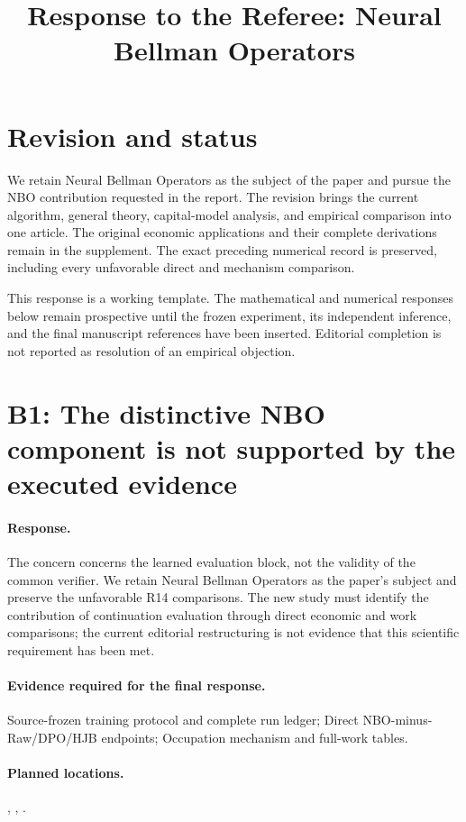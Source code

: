 \begin{frontmatter}
\title{Response to the Referee: Neural Bellman Operators}
\end{frontmatter}
\section*{Revision and status}
We retain Neural Bellman Operators as the subject of the paper and pursue the
NBO contribution requested in the report. The revision brings the current
algorithm, general theory, capital-model analysis, and empirical comparison into
one article. The original economic applications and their complete derivations
remain in the supplement. The exact preceding numerical record is preserved,
including every unfavorable direct and mechanism comparison.

This response is a working template. The mathematical and numerical responses
below remain prospective until the frozen experiment, its independent inference,
and the final manuscript references have been inserted. Editorial completion is
not reported as resolution of an empirical objection.

\section*{B1: The distinctive NBO component is not supported by the executed evidence}
\paragraph*{Response.} The concern concerns the learned evaluation block, not the validity of the common verifier. We retain Neural Bellman Operators as the paper's subject and preserve the unfavorable R14 comparisons. The new study must identify the contribution of continuation evaluation through direct economic and work comparisons; the current editorial restructuring is not evidence that this scientific requirement has been met.
\paragraph*{Evidence required for the final response.} Source-frozen training protocol and complete run ledger; Direct NBO-minus-Raw/DPO/HJB endpoints; Occupation mechanism and full-work tables.
\paragraph*{Planned locations.} , , .

